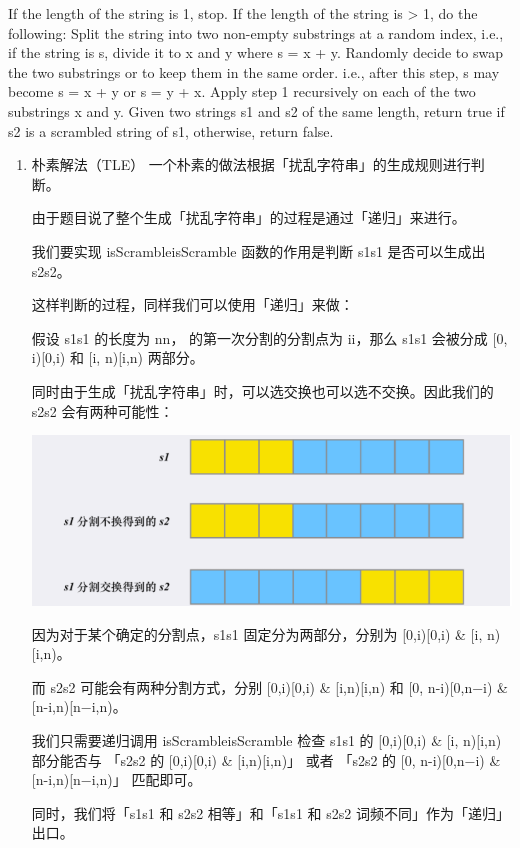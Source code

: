 \documentclass[9pt, b5paaper]{book}
\begin{document}
If the length of the string is 1, stop.
If the length of the string is > 1, do the following:
Split the string into two non-empty substrings at a random index, i.e., if the string is s, divide it to x and y where s = x + y.
Randomly decide to swap the two substrings or to keep them in the same order. i.e., after this step, s may become s = x + y or s = y + x.
Apply step 1 recursively on each of the two substrings x and y.
Given two strings s1 and s2 of the same length, return true if s2 is a scrambled string of s1, otherwise, return false.
\begin{enumerate}
\item 朴素解法（TLE）
\label{sec-1-0-2-1}
一个朴素的做法根据「扰乱字符串」的生成规则进行判断。

由于题目说了整个生成「扰乱字符串」的过程是通过「递归」来进行。

我们要实现 isScrambleisScramble 函数的作用是判断 s1s1 是否可以生成出 s2s2。

这样判断的过程，同样我们可以使用「递归」来做：

假设 s1s1 的长度为 nn， 的第一次分割的分割点为 ii，那么 s1s1 会被分成 [0, i)[0,i) 和 [i, n)[i,n) 两部分。

同时由于生成「扰乱字符串」时，可以选交换也可以选不交换。因此我们的 s2s2 会有两种可能性：

\includegraphics[width=.9\linewidth]{./pic/isScramble.png}


因为对于某个确定的分割点，s1s1 固定分为两部分，分别为 [0,i)[0,i) \& [i, n)[i,n)。

而 s2s2 可能会有两种分割方式，分别 [0,i)[0,i) \& [i,n)[i,n) 和 [0, n-i)[0,n−i) \& [n-i,n)[n−i,n)。

我们只需要递归调用 isScrambleisScramble 检查 s1s1 的 [0,i)[0,i) \& [i, n)[i,n) 部分能否与 「s2s2 的 [0,i)[0,i) \& [i,n)[i,n)」 或者 「s2s2 的 [0, n-i)[0,n−i) \& [n-i,n)[n−i,n)」 匹配即可。

同时，我们将「s1s1 和 s2s2 相等」和「s1s1 和 s2s2 词频不同」作为「递归」出口。


\end{enumerate}
\end{document}
